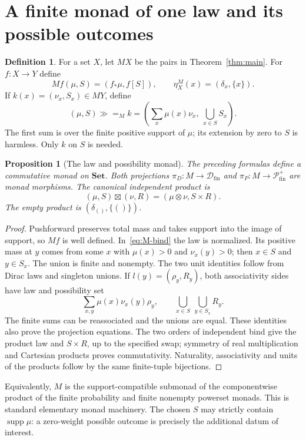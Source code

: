 \documentclass[11pt,a4paper]{article}
\newtheorem{proposition}[theorem]{Proposition}
\theoremstyle{definition}
\newtheorem{definition}[theorem]{Definition}
\newcommand{\Set}{\mathbf{Set}}
\newcommand{\Dfin}{\mathcal D_{\mathrm{fin}}}
\newcommand{\Pfin}{\mathcal P_{\mathrm{fin}}^{+}}
\newcommand{\supp}{\operatorname{supp}}
\begin{document}
\section{A finite monad of one law and its possible outcomes}\label{sec:M}
\begin{definition}
For a set $X$, let $MX$ be the pairs in Theorem~\ref{thm:main}. For
$f:X\to Y$ define
\[
 Mf(\mu,S)=(f_*\mu,f[S]),\qquad
 \eta^M_X(x)=(\delta_x,\{x\}).
\]
If $k(x)=(\nu_x,S_x)\in MY$, define
\begin{equation}\label{eq:M-bind}
 (\mu,S)\mathbin{\gg=_M}k
   =\left(\sum_x\mu(x)\nu_x,\ \bigcup_{x\in S}S_x\right).
\end{equation}
The first sum is over the finite positive support of $\mu$; its extension
by zero to $S$ is harmless. Only $k$ on $S$ is needed.
\end{definition}

\begin{proposition}[The law and possibility monad]\label{prop:M}
The preceding formulas define a commutative monad on $\Set$. Both
projections $\pi_D:M\to\Dfin$ and $\pi_P:M\to\Pfin$ are monad
morphisms. The canonical independent product is
\begin{equation}\label{eq:M-product}
 (\mu,S)\boxtimes(\nu,R)=(\mu\otimes\nu,S\times R).
\end{equation}
The empty product is $(\delta_{()},\{()\})$.
\end{proposition}
\begin{proof}
Pushforward preserves total mass and takes support into the image of
support, so $Mf$ is well defined. In~\eqref{eq:M-bind} the law is
normalized. Its positive mass at $y$ comes from some $x$ with
$\mu(x)>0$ and $\nu_x(y)>0$; then $x\in S$ and $y\in S_x$.
The union is finite and nonempty. The two unit identities follow from
Dirac laws and singleton unions. If $l(y)=(\rho_y,R_y)$, both
associativity sides have law and possibility set
\[
 \sum_{x,y}\mu(x)\nu_x(y)\rho_y,
 \qquad \bigcup_{x\in S}\ \bigcup_{y\in S_x}R_y.
\]
The finite sums can be reassociated and the unions are equal. These
identities also prove the projection equations. The two orders of
independent bind give the product law and $S\times R$, up to the
specified swap; symmetry of real multiplication and Cartesian products
proves commutativity. Naturality, associativity and units of the products
follow by the same finite-tuple bijections.
\end{proof}
Equivalently, $M$ is the support-compatible submonad of the componentwise
product of the finite probability and finite nonempty powerset monads.
This is standard elementary monad machinery. The chosen $S$ may strictly
contain $\supp\mu$: a zero-weight possible outcome is precisely the
additional datum of interest.
\end{document}
